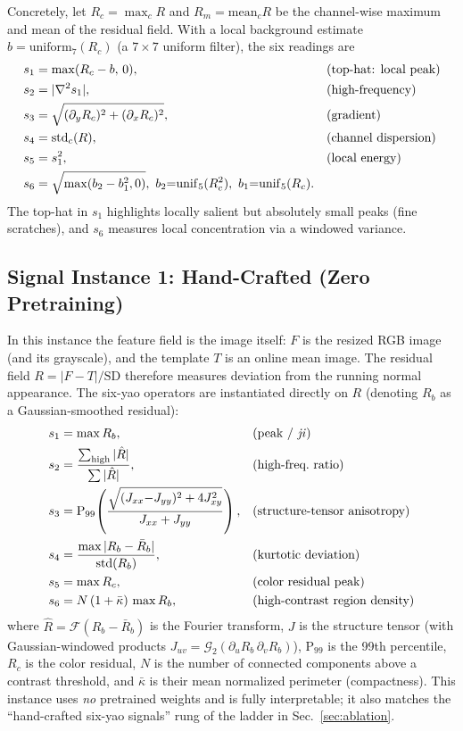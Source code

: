 \documentclass[journal,10pt]{IEEEtran}
\begin{document}
Concretely, let $R_c=\max_c R$ and $R_m=\mathrm{mean}_c R$ be the channel-wise
maximum and mean of the residual field. With a local background estimate
$b=\mathrm{uniform}_7(R_c)$ (a $7{\times}7$ uniform filter), the six readings
are
\begin{align}
s_1 &= \max(R_c-b,\,0), && \text{(top-hat: local peak)}\\
s_2 &= |\nabla^2 s_1|, && \text{(high-frequency)}\notag\\
s_3 &= \sqrt{(\partial_y R_c)^2+(\partial_x R_c)^2}, && \text{(gradient)}\notag\\
s_4 &= \mathrm{std}_c(R), && \text{(channel dispersion)}\notag\\
s_5 &= s_1^2, && \text{(local energy)}\notag\\
s_6 &= \sqrt{\max(b_2-b_1^2,0)},\ b_2{=}\mathrm{unif}_5(R_c^2),\ b_1{=}\mathrm{unif}_5(R_c). \notag
\end{align}
The top-hat in $s_1$ highlights locally salient but absolutely small peaks
(fine scratches), and $s_6$ measures local concentration via a windowed
variance.

\subsection{Signal Instance 1: Hand-Crafted (Zero Pretraining)}
In this instance the feature field is the image itself: $F$ is the resized
RGB image (and its grayscale), and the template $T$ is an online mean
image. The residual field $R=|F-T|/\mathrm{SD}$ therefore measures
deviation from the running normal appearance. The six-yao operators are
instantiated directly on $R$ (denoting $R_b$ as a Gaussian-smoothed
residual):
\begin{align}
s_1 &= \max R_b, && \text{(peak / \emph{ji})}\\
s_2 &= \frac{\sum_{\text{high}}|\hat R|}{\sum|\hat R|}, &&
        \text{(high-freq.~{}ratio)}\\
s_3 &= \mathrm{P}_{99}\!\left(\frac{\sqrt{(J_{xx}{-}J_{yy})^2+4J_{xy}^2}}{J_{xx}+J_{yy}}\right), &&
        \text{(structure-tensor anisotropy)}\notag\\
s_4 &= \frac{\max|R_b-\bar R_b|}{\mathrm{std}(R_b)}, && \text{(kurtotic deviation)}\notag\\
s_5 &= \max R_c, && \text{(color residual peak)}\notag\\
s_6 &= N\,(1+\bar\kappa)\,\max R_b, && \text{(high-contrast region density)}\notag
\end{align}
where $\hat R=\mathcal{F}(R_b-\bar R_b)$ is the Fourier transform, $J$ is
the structure tensor (with Gaussian-windowed products $J_{uv}=\mathcal{G}_2(\partial_u R_b\,\partial_v R_b)$), $\mathrm{P}_{99}$ is the 99th
percentile, $R_c$ is the color residual, $N$ is the number of connected
components above a contrast threshold, and $\bar\kappa$ is their mean
normalized perimeter (compactness). This instance uses \emph{no}
pretrained weights and is fully interpretable; it also matches the
``hand-crafted six-yao signals'' rung of the ladder in
Sec.~\ref{sec:ablation}.
\end{document}

